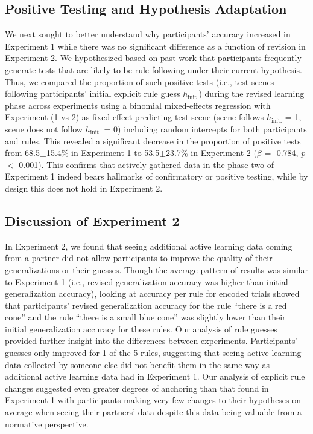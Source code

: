 \documentclass[doc,natbib,floatsintext]{apa7}
\newcommand{\hi}{h_{\mathrm{init.}}}
\begin{document}
 
\subsection{Positive Testing and Hypothesis Adaptation}

We next sought to better understand why participants' accuracy increased in Experiment 1 while there was no significant difference as a function of revision in Experiment 2. We hypothesized based on past work \citep{wason1960failure, klayman1987confirmation} that participants frequently generate tests that are likely to be rule following under their current hypothesis. Thus, we compared the proportion of such positive tests (i.e., test scenes following participants' initial explicit rule guess $\hi$) during the revised learning phase across experiments using a binomial mixed-effects regression with Experiment (1 vs 2) as fixed effect predicting test scene (scene follows $\hi$ = 1, scene does not follow $\hi$ = 0) including random intercepts for both participants and rules. This revealed a significant decrease in the proportion of positive tests from 68.5$\pm$15.4\% in Experiment 1 to 53.5$\pm$23.7\% in Experiment 2 ($\beta$ = -0.784, $p$ $<$ 0.001). This confirms that actively gathered data in the phase two of Experiment 1 indeed bears hallmarks of confirmatory or positive testing, while by design this does not hold in Experiment 2. 

\subsection{Discussion of Experiment 2}
In Experiment 2, we found that seeing additional active learning data coming from a partner did not allow participants to improve the quality of their generalizations or their guesses. Though the average pattern of results was similar to Experiment 1 (i.e., revised generalization accuracy was higher than initial generalization accuracy), looking at accuracy per rule for encoded trials showed that participants' revised generalization accuracy for the rule ``there is a red cone'' and the rule ``there is a small blue cone'' was slightly lower than their initial generalization accuracy for these rules. Our analysis of rule guesses provided further insight into the differences between experiments. Participants' guesses only improved for 1 of the 5 rules, suggesting that seeing active learning data collected by someone else did not benefit them in the same way as additional active learning data had in Experiment 1. Our analysis of explicit rule changes suggested even greater degrees of anchoring than that found in Experiment 1 with participants making very few changes to their hypotheses on average when seeing their partners' data despite this data being valuable from a normative perspective.
\end{document}

